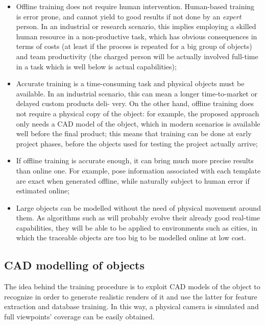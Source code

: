\begin{itemize}
  \item{Offline training does not require human intervention. Human-based
      training is error prone, and cannot yield to good results if not done by an
      \emph{expert} person. In an industrial or research scenario, this implies
      employing a skilled human resource in a non-productive task, which has obvious
      consequences in terms of costs (at least if the process is repeated
      for a big group of objects) and team productivity (the charged person will be
      actually involved full-time in a task which is well below is actual
    capabilities);}
  \item{Accurate training is a time-consuming task and physical objects must be available. In an
      industrial scenario, this can mean a longer time-to-market or delayed custom products deli-
      very. On the other hand, offline training does not require a physical copy of the object: for
      example, the proposed approach only needs a CAD model of the object, which in modern
      scenarios is available well before the final product; this means that training can be done at
      early project phases, before the objects used for testing the project actually
    arrive;}
  \item{If offline training is accurate enough, it can bring much more precise results than online
      one. For example, pose information associated with each template are exact when generated
    offline, while naturally subject to human error if estimated online;}
  \item{Large objects can be modelled without the need of physical movement around them. As
      algorithms such as \cite{linemod-pipeline} will probably evolve their already good real-time capabilities, they will
      be able to be applied to environments such as cities, in which the traceable objects are too
    big to be modelled online at low cost.}
\end{itemize}

\subsection{CAD modelling of objects}
The idea behind the training procedure is to exploit CAD models of the object
to recognize in order to generate realistic renders of it and use the latter
for feature extraction and database training. In this way, a physical camera is
simulated and full viewpoints' coverage can be easily obtained.

